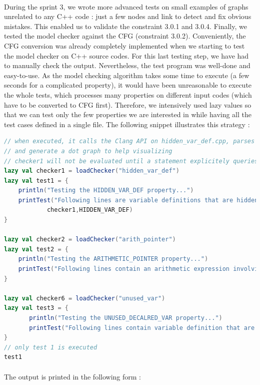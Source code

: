 \documentclass{report}
\begin{document}
\paragraph{}
\hspace{4mm}During the sprint 3, we wrote more advanced tests on small examples of graphs unrelated to any C++ code : just a few nodes and link to detect and fix obvious mistakes. This enabled
us to validate the constraint 3.0.1 and 3.0.4.
Finally, we tested the model checker against the CFG (constraint 3.0.2). Conveniently, the CFG conversion was already completely implemented when we starting to test the
model checker on C++ source codes. For this last testing step, we have had to manually check the output. Nevertheless, the test program was well-done and
easy-to-use. As the model checking algorithm takes some time to execute (a few seconds for a complicated property), it would have been unreasonable to execute the whole
tests, which processes many properties on different input codes (which have to be converted to CFG first). Therefore, we intensively used lazy values so that we can
test only the few properties we are interested in while having all the test cases defined in a single file.
The following snippet illustrates this strategy :

\begin{lstlisting}[language=scala]
// when executed, it calls the Clang API on hidden_var_def.cpp, parses the AST file, convert it into a CFG,
// and generate a dot graph to help visualizing
// checker1 will not be evaluated until a statement explicitely queries its value
lazy val checker1 = loadChecker("hidden_var_def")
lazy val test1 = {
	println("Testing the HIDDEN_VAR_DEF property...")
	printTest("Following lines are variable definitions that are hidden later in the code (may contain false positive results) :",
			checker1,HIDDEN_VAR_DEF)
}
	
lazy val checker2 = loadChecker("arith_pointer")
lazy val test2 = {
	println("Testing the ARITHMETIC_POINTER property...")
	printTest("Following lines contain an arithmetic expression involving a pointer :",checker2,ARITHMETIC_POINTER)
}

lazy val checker6 = loadChecker("unused_var")
lazy val test3 = {
       println("Testing the UNUSED_DECALRED_VAR property...")
       printTest("Following lines contain variable definition that are not used :",checker3,UNUSED_DECALRED_VAR)
}
// only test 1 is executed
test1
\end{lstlisting}
\paragraph{}
\hspace{4mm}The output is printed in the following form :
\end{document}
